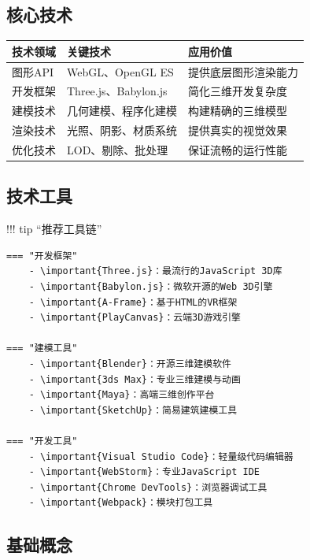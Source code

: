 \hypertarget{ux6838ux5fc3ux6280ux672f}{%
\subsection{核心技术}\label{ux6838ux5fc3ux6280ux672f}}

\begin{longtable}[]{@{}lll@{}}
\toprule\noalign{}
技术领域 & 关键技术 & 应用价值 \\
\midrule\noalign{}
\endhead
\bottomrule\noalign{}
\endlastfoot
图形API & WebGL、OpenGL ES & 提供底层图形渲染能力 \\
开发框架 & Three.js、Babylon.js & 简化三维开发复杂度 \\
建模技术 & 几何建模、程序化建模 & 构建精确的三维模型 \\
渲染技术 & 光照、阴影、材质系统 & 提供真实的视觉效果 \\
优化技术 & LOD、剔除、批处理 & 保证流畅的运行性能 \\
\end{longtable}

\hypertarget{ux6280ux672fux5de5ux5177}{%
\subsection{技术工具}\label{ux6280ux672fux5de5ux5177}}

!!! tip ``推荐工具链''

\begin{verbatim}
=== "开发框架"
    - \important{Three.js}：最流行的JavaScript 3D库
    - \important{Babylon.js}：微软开源的Web 3D引擎  
    - \important{A-Frame}：基于HTML的VR框架
    - \important{PlayCanvas}：云端3D游戏引擎
    
=== "建模工具"
    - \important{Blender}：开源三维建模软件
    - \important{3ds Max}：专业三维建模与动画
    - \important{Maya}：高端三维创作平台
    - \important{SketchUp}：简易建筑建模工具
    
=== "开发工具"
    - \important{Visual Studio Code}：轻量级代码编辑器
    - \important{WebStorm}：专业JavaScript IDE
    - \important{Chrome DevTools}：浏览器调试工具
    - \important{Webpack}：模块打包工具
\end{verbatim}

\hypertarget{ux57faux7840ux6982ux5ff5}{%
\subsection{基础概念}\label{ux57faux7840ux6982ux5ff5}}

